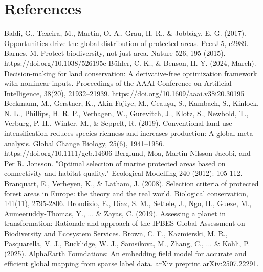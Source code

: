 \documentclass[12pt]{article}
\theoremstyle{break} %
\begin{document}
\section{References}\label{references}
Baldi, G., Texeira, M., Martin, O. A., Grau, H. R., \& Jobbágy, E. G. (2017). Opportunities drive the global distribution of protected areas. PeerJ 5, e2989.
\newline \newline
Barnes, M. Protect biodiversity, not just area. Nature 526, 195 (2015). https://doi.org/10.1038/526195e
\newline \newline
Bühler, C. K., \& Benson, H. Y. (2024, March). Decision-making for land conservation: A derivative-free optimization framework with nonlinear inputs. Proceedings of the AAAI Conference on Artificial Intelligence, 38(20), 21932–21939. https://doi.org/10.1609/aaai.v38i20.30195
\newline \newline
Beckmann, M., Gerstner, K., Akin-Fajiye, M., Ceaușu, S., Kambach, S., Kinlock, N. L., Phillips, H. R. P., Verhagen, W., Gurevitch, J., Klotz, S., Newbold, T., Verburg, P. H., Winter, M., \& Seppelt, R. (2019). Conventional land-use intensification reduces species richness and increases production: A global meta-analysis. Global Change Biology, 25(6), 1941–1956. https://doi.org/10.1111/gcb.14606
\newline \newline
Berglund, Moa, Martin Nilsson Jacobi, and Per R. Jonsson. "Optimal selection of marine protected areas based on connectivity and habitat quality." Ecological Modelling 240 (2012): 105-112.
\newline \newline
Branquart, E., Verheyen, K., \& Latham, J. (2008). Selection criteria of protected forest areas in Europe: the theory and the real world. Biological conservation, 141(11), 2795-2806.
\newline \newline
Brondizio, E., Díaz, S. M., Settele, J., Ngo, H., Gueze, M., Aumeeruddy-Thomas, Y., ... \& Zayas, C. (2019). Assessing a planet in transformation: Rationale and approach of the IPBES Global Assessment on Biodiversity and Ecosystem Services.
\newline \newline
Brown, C. F., Kazmierski, M. R., Pasquarella, V. J., Rucklidge, W. J., Samsikova, M., Zhang, C., ... \& Kohli, P. (2025). AlphaEarth Foundations: An embedding field model for accurate and efficient global mapping from sparse label data. arXiv preprint arXiv:2507.22291.
\end{document}
